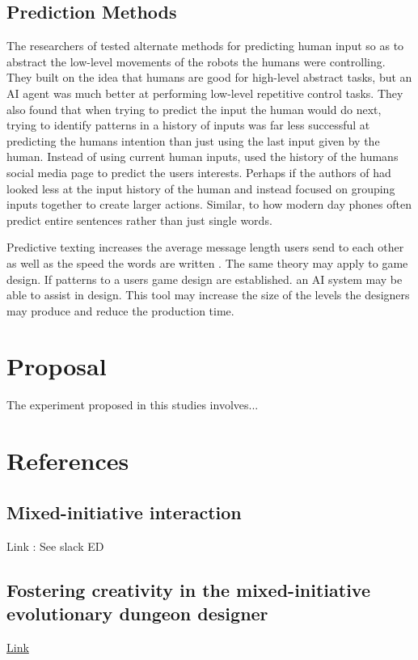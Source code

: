 \documentclass[journal]{IEEEtran}
\begin{document}
\subsection{Prediction Methods} \label{prediction}
The researchers of \cite{chipalkatty2013less} tested alternate methods for predicting human input so as to abstract the low-level movements of the robots the humans were controlling. They built on the idea that humans are good for high-level abstract tasks, but an AI agent was much better at performing low-level repetitive control tasks. They also found that when trying to predict the input the human would do next, trying to identify patterns in a history of inputs was far less successful at predicting the humans intention than just using the last input given by the human. Instead of using current human inputs, \cite{bhatia2016targeted} used the history of the humans social media page to predict the users interests. Perhaps if the authors of \cite{chipalkatty2013less} had looked less at the input history of the human and instead focused on grouping inputs together to create larger actions. Similar,  to how modern day phones often predict entire sentences rather than just single words.

Predictive texting increases the average message length users send to each other \cite{ling2005length} as well as the speed the words are written \cite{dunlop2000predictive}. The same theory may apply to game design. If patterns to a users game design are established. an AI system may be able to assist in design. This tool may increase the size of the levels the designers may produce and reduce the production time. 

\section{Proposal}
The experiment proposed in this studies involves...

\section{References}
\subsection{Mixed-initiative interaction\cite{allen1999mixed}}
Link : See slack ED

\subsection{Fostering creativity in the mixed-initiative evolutionary dungeon designer\cite{alvarez2018fostering}}
\href{https://muep.mau.se/bitstream/handle/2043/25889/Nolasco_O%CC%88sterman.pdf?sequence=1&isAllowed=y}{Link}
\end{document}
